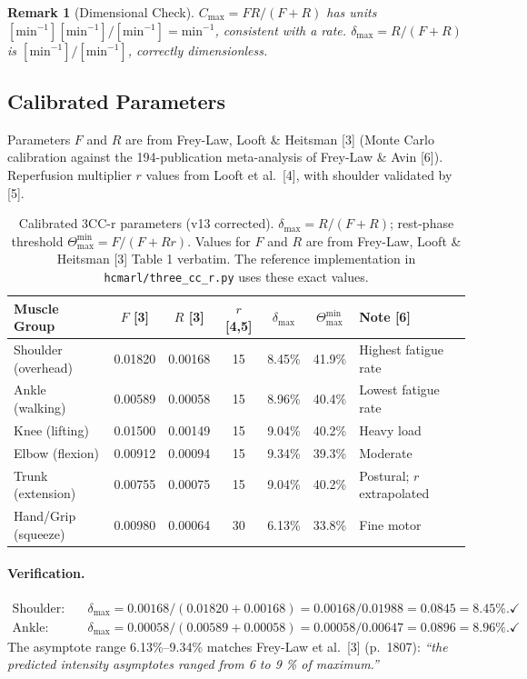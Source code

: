 \documentclass[11pt,a4paper]{article}
\newtheorem{remark}[theorem]{Remark}
\begin{document}
\begin{remark}[Dimensional Check]
$C_{\max} = FR/(F+R)$ has units $[\mathrm{min}^{-1}][\mathrm{min}^{-1}] /
[\mathrm{min}^{-1}] = \mathrm{min}^{-1}$, consistent with a rate.
$\delta_{\max} = R/(F+R)$ is $[\mathrm{min}^{-1}]/[\mathrm{min}^{-1}]$,
correctly dimensionless.
\end{remark}

\subsection{Calibrated Parameters}

Parameters $F$ and $R$ are from Frey-Law, Looft \& Heitsman [3] (Monte
Carlo calibration against the 194-publication meta-analysis of
Frey-Law \& Avin [6]). Reperfusion multiplier $r$ values from Looft
et al.\ [4], with shoulder validated by [5].

\begin{table}[h]
\centering
\caption{Calibrated 3CC-r parameters (v13 corrected). $\delta_{\max} = R/(F+R)$;
rest-phase threshold $\Theta_{\max}^{\min} = F/(F + Rr)$. Values for
$F$ and $R$ are from Frey-Law, Looft \& Heitsman [3] Table 1
verbatim. The reference implementation in \texttt{hcmarl/three\_cc\_r.py}
uses these exact values.}\label{tab:params}
\begin{tabular}{lcccccl}
\toprule
\textbf{Muscle Group} & $F$ [3] & $R$ [3] & $r$ [4,5] & $\delta_{\max}$ & $\Theta_{\max}^{\min}$ & \textbf{Note [6]} \\
\midrule
Shoulder (overhead) & 0.01820 & 0.00168 & 15 & 8.45\% & 41.9\% & Highest fatigue rate \\
Ankle (walking)     & 0.00589 & 0.00058 & 15 & 8.96\% & 40.4\% & Lowest fatigue rate \\
Knee (lifting)      & 0.01500 & 0.00149 & 15 & 9.04\% & 40.2\% & Heavy load \\
Elbow (flexion)     & 0.00912 & 0.00094 & 15 & 9.34\% & 39.3\% & Moderate \\
Trunk (extension)   & 0.00755 & 0.00075 & 15 & 9.04\% & 40.2\% & Postural; $r$ extrapolated \\
Hand/Grip (squeeze) & 0.00980 & 0.00064 & 30 & 6.13\% & 33.8\% & Fine motor \\
\bottomrule
\end{tabular}
\end{table}

\paragraph{Verification.}
\begin{align*}
\text{Shoulder:} \quad & \delta_{\max} = 0.00168 / (0.01820 + 0.00168) = 0.00168/0.01988 = 0.0845 = 8.45\%. \checkmark \\
\text{Ankle:} \quad & \delta_{\max} = 0.00058 / (0.00589 + 0.00058) = 0.00058/0.00647 = 0.0896 = 8.96\%. \checkmark
\end{align*}
The asymptote range 6.13\%--9.34\% matches Frey-Law et al.\ [3]
(p.~1807): \emph{``the predicted intensity asymptotes ranged from 6
to 9 \% of maximum.''}
\end{document}
